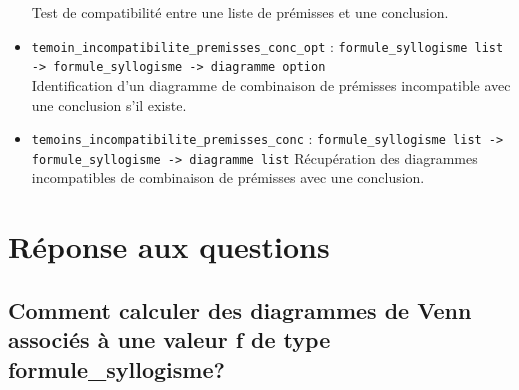 \documentclass{article}
\begin{document}
\begin{itemize}
Test de compatibilité entre une liste de prémisses et une conclusion.
\item
\texttt{temoin\_incompatibilite\_premisses\_conc\_opt} : \texttt{formule\_syllogisme list -> formule\_syllogisme -> diagramme option} \\
Identification d'un diagramme de combinaison de prémisses incompatible avec une conclusion s'il existe.
\item
\texttt{temoins\_incompatibilite\_premisses\_conc} : \texttt{formule\_syllogisme list -> formule\_syllogisme -> diagramme list} 
Récupération des diagrammes incompatibles de combinaison de prémisses avec une conclusion.
\end{itemize}
\newpage


\section{Réponse aux questions}

\subsection{\textbf{Comment calculer des diagrammes de Venn associés à une valeur f de type formule\_syllogisme?}}
\end{document}
